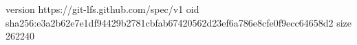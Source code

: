 version https://git-lfs.github.com/spec/v1
oid sha256:e3a2b62e7e1df94429b2781cbfab67420562d23ef6a786e8cfe0f9ecc64658d2
size 262240
